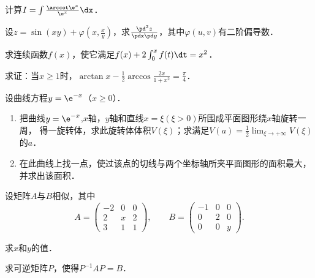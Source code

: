 \documentclass[plain,noanswer,medmath]{../../template/jnuexam}
\begin{document}
\begin{problem}
计算$I = \int \frac{\arccot\e^x}{\e^x} \dx$．
\end{problem}



\begin{problem}
设$z = \sin(xy) + \varphi(x,\frac{x}{y})$，求$\frac{\pd^2 z}{\pdx\pd y}$，其中$\varphi (u,v)$有二阶偏导数．
\end{problem}



\begin{problem}
求连续函数$f(x)$，使它满足$f(x) + 2\int_0^x f(t)\dt = x^2$．
\end{problem}



\begin{problem}
求证：当$x \ge 1$时，$\arctan x - \frac{1}{2}\arccos \frac{2x}{1 + x^2} = \frac{\pi}{4}$．
\end{problem}



\begin{problem}
设曲线方程$y = \e^{- x}$（$x \ge 0$）．
\begin{enumerate}
\item 把曲线$y = \e^{- x}$,$x$轴，$y$轴和直线$x = \xi(\xi > 0)$所围成平面图形绕$x$轴旋转一周，
得一旋转体，求此旋转体体积$V(\xi)$；求满足$V(a) = \frac{1}{2}\lim_{\xi \to +\infty} V(\xi)$的$a$．
\item 在此曲线上找一点，使过该点的切线与两个坐标轴所夹平面图形的面积最大，并求出该面积．
\end{enumerate}
\end{problem}



\begin{problem}
设矩阵$A$与$B$相似，其中
$$A = \begin{pmatrix}
  -2 & 0 & 0 \\
   2 & x & 2 \\
   3 & 1 & 1
\end{pmatrix},\qquad B = \begin{pmatrix}
  -1 & 0 & 0 \\
   0 & 2 & 0 \\
   0 & 0 & y
\end{pmatrix}.$$
\begin{enumerate*}
\item 求$x$和$y$的值．
\item 求可逆矩阵$P$，使得$P^{-1} AP = B$．
\end{enumerate*}
\end{problem}
\end{document}
